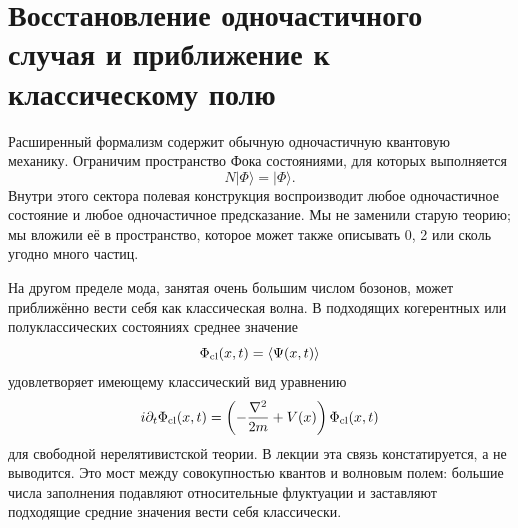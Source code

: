 \begin{classroomqa}
\end{classroomqa}

\begin{classroomqa}
\end{classroomqa}

\section{Восстановление одночастичного случая и приближение к классическому полю}

Расширенный формализм содержит обычную одночастичную квантовую механику. Ограничим пространство Фока состояниями, для которых выполняется
\begin{equation}
N|\Phi\rangle=|\Phi\rangle.
\end{equation}
Внутри этого сектора полевая конструкция воспроизводит любое одночастичное состояние и любое одночастичное предсказание. Мы не заменили старую теорию; мы вложили её в пространство, которое может также описывать 0, 2 или сколь угодно много частиц.

На другом пределе мода, занятая очень большим числом бозонов, может приближённо вести себя как классическая волна. В подходящих когерентных или полуклассических состояниях среднее значение
\begin{equation}
\Phi_{\rm cl}(x,t)=\langle\Psi(x,t)\rangle
\end{equation}
удовлетворяет имеющему классический вид уравнению
\begin{equation}
i\partial_t\Phi_{\rm cl}(x,t)
=\left(-\frac{\nabla^2}{2m}+V(x)\right)\Phi_{\rm cl}(x,t)
\label{eq:l07-classical-schrodinger}
\end{equation}
для свободной нерелятивистской теории. В лекции эта связь констатируется, а не выводится. Это мост между совокупностью квантов и волновым полем: большие числа заполнения подавляют относительные флуктуации и заставляют подходящие средние значения вести себя классически.

